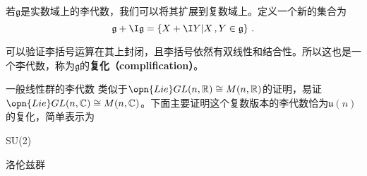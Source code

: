 

\begin{definition}{}
若$\mathfrak g$是实数域上的李代数，我们可以将其扩展到复数域上。定义一个新的集合为
\begin{equation}
\mathfrak g+\I \mathfrak g=\{X+\I Y|X\,,Y\in\mathfrak g\}~.
\end{equation}
\end{definition}
可以验证李括号运算在其上封闭，且李括号依然有双线性和结合性。所以这也是一个李代数，称为$\mathfrak g$的\textbf{复化（complification）}。
\begin{example}{一般线性群的李代数}
类似于$\opn{Lie}GL(n,\mathbb R)\cong M(n,\mathbb R)$的证明，易证$\opn{Lie}GL(n,\mathbb C)\cong M(n,\mathbb C)$。下面主要证明这个复数版本的李代数恰为$\mathfrak u(n)$的复化，简单表示为$$
\end{example}
\begin{example}{SU(2)}

\end{example}
\begin{example}{洛伦兹群}

\end{example}